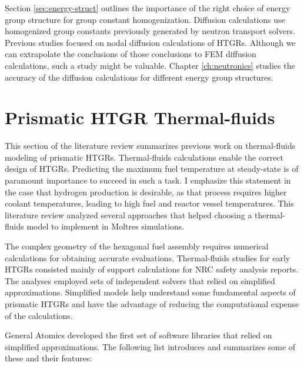 Section \ref{sec:energy-struct} outlines the importance of the right choice of energy group structure for group constant homogenization.
Diffusion calculations use homogenized group constants previously generated by neutron transport solvers.
Previous studies focused on nodal diffusion calculations of HTGRs.
Although we can extrapolate the conclusions of those conclusions to \gls{FEM} diffusion calculations, such a study might be valuable.
Chapter \ref{ch:neutronics} studies the accuracy of the diffusion calculations for different energy group structures.

\section{Prismatic HTGR Thermal-fluids}
\label{sec:litrev-thermalf}

This section of the literature review summarizes previous work on thermal-fluids modeling of prismatic HTGRs.
Thermal-fluids calculations enable the correct design of \glspl{HTGR}.
Predicting the maximum fuel temperature at steady-state is of paramount importance to succeed in such a task.
I emphasize this statement in the case that hydrogen production is desirable, as that process requires higher coolant temperatures, leading to high fuel and reactor vessel temperatures.
This literature review analyzed several approaches that helped choosing a thermal-fluids model to implement in Moltres simulations.

The complex geometry of the hexagonal fuel assembly requires numerical calculations for obtaining accurate evaluations.
Thermal-fluids studies for early \glspl{HTGR} consisted mainly of support calculations for \gls{NRC} safety analysis reports.
The analyses employed sets of independent solvers that relied on simplified approximations.
Simplified models help understand some fundamental aspects of prismatic HTGRs and have the advantage of reducing the computational expense of the calculations.

General Atomics \cite{shenoy_htgr_1974} developed the first set of software libraries that relied on simplified approximations.
The following list introduces and summarizes some of these and their features:

